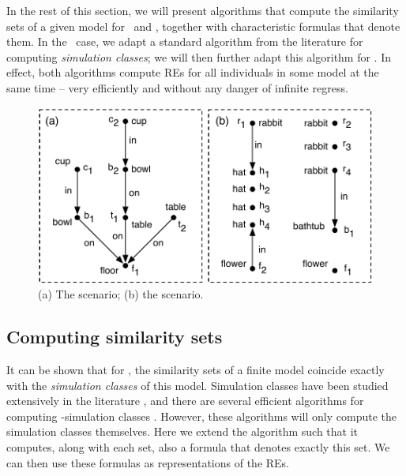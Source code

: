In the rest of this section, we will present algorithms that compute
the similarity sets of a given model for \alc\ and \el, together with
characteristic formulas that denote them.  In the \alc\ case, we adapt
a standard algorithm from the literature for computing
\emph{simulation classes}; we will then further adapt this algorithm
for \el.  In effect, both algorithms compute REs for all individuals
in some model at the same time -- very efficiently and without any
danger of infinite regress.


\begin{figure}[t]
  \centering
  \includegraphics[width=\columnwidth]{pic-dale-haddock}
  \caption{(a) The 
    scenario; (b) the  scenario.}
  \label{fig:dale-haddock}
\end{figure}


\subsection{Computing similarity sets}

It can be shown that for \alc, the similarity sets of a finite model
coincide exactly with the \emph{simulation classes} of this model.
Simulation classes have been studied extensively in the literature
\cite{blac:moda01,kurt:expr99}, and there are several efficient
algorithms for computing \alc-simulation classes
\cite{hopc:algo71,paig:thre87,dovier04:_effic_algor_for_comput_bisim_equiv}.
However, these algorithms will only compute the simulation classes
themselves. Here we extend the  algorithm such
that it computes, along with each set, also a formula that denotes
exactly this set.  We can then use these formulas as representations
of the REs.

